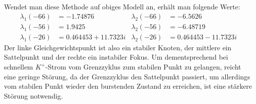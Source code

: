 \documentclass[12pt,a4paper]{article}
\begin{document}
\\\\
Wendet man diese Methode auf obiges Modell an, erhält man folgende Werte:
\begin{align*}
\lambda_1(-66)&=-1.74876 & \lambda_2(-66)&=-6.5626\\
\lambda_1(-56)&=1.9425& \lambda_2(-56)&=-6.48719\\
\lambda_1(-26)&=0.464453 + 11.7323i& \lambda_2(-26)&=0.464453 - 11.7323i
\end{align*}
Der linke Gleichgewichtspunkt ist also ein stabiler Knoten, der mittlere ein Sattelpunkt und der rechte ein instabiler Fokus. Um dementsprechend bei schnellem $K^+$-Strom vom Grenzzyklus zum stabilen Punkt zu gelangen, reicht eine geringe Störung, da der Grenzzyklus den Sattelpunkt passiert, um allerdings vom stabilen Punkt wieder den burstenden Zustand zu erreichen, ist eine stärkere Störung notwendig.
\end{document}
